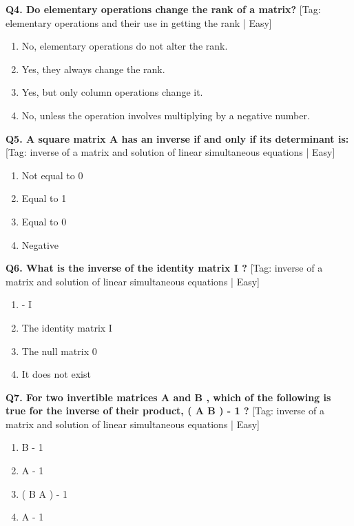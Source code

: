 \noindent\textbf{Q4. Do elementary operations change the rank of a matrix?} \hfill [Tag: elementary operations and their use in getting the rank | Easy]
\begin{enumerate}[label=(\alph*),topsep=2pt,itemsep=1pt,partopsep=0pt,parsep=0pt]
    \item {{No, elementary operations do not alter the rank.}}
    \item {{Yes, they always change the rank.}}
    \item {{Yes, but only column operations change it.}}
    \item {{No, unless the operation involves multiplying by a negative number.}}
\end{enumerate}
\vspace{2mm}

\noindent\textbf{Q5. A square matrix A has an inverse if and only if its determinant is:} \hfill [Tag: inverse of a matrix and solution of linear simultaneous equations | Easy]
\begin{enumerate}[label=(\alph*),topsep=2pt,itemsep=1pt,partopsep=0pt,parsep=0pt]
    \item {{Not equal to 0}}
    \item {{Equal to 1}}
    \item {{Equal to 0}}
    \item {{Negative}}
\end{enumerate}
\vspace{2mm}

\noindent\textbf{Q6. What is the inverse of the identity matrix I ?} \hfill [Tag: inverse of a matrix and solution of linear simultaneous equations | Easy]
\begin{enumerate}[label=(\alph*),topsep=2pt,itemsep=1pt,partopsep=0pt,parsep=0pt]
    \item {{- I}}
    \item {{The identity matrix I}}
    \item {{The null matrix 0}}
    \item {{It does not exist}}
\end{enumerate}
\vspace{2mm}

\noindent\textbf{Q7. For two invertible matrices A and B , which of the following is true for the inverse of their product, ( A B ) - 1 ?} \hfill [Tag: inverse of a matrix and solution of linear simultaneous equations | Easy]
\begin{enumerate}[label=(\alph*),topsep=2pt,itemsep=1pt,partopsep=0pt,parsep=0pt]
    \item {{B - 1}}
    \item {{A - 1}}
    \item {{( B A ) - 1}}
    \item {{A - 1}}
\end{enumerate}
\vspace{2mm}

